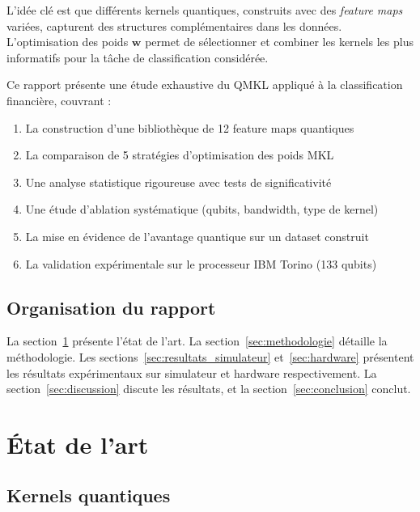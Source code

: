 \documentclass[12pt,a4paper]{article}
\newcommand{\w}{\mathbf{w}}
\begin{document}
L'idée clé est que différents kernels quantiques, construits avec des \textit{feature maps} variées, capturent des structures complémentaires dans les données. L'optimisation des poids $\w$ permet de sélectionner et combiner les kernels les plus informatifs pour la tâche de classification considérée.

Ce rapport présente une étude exhaustive du QMKL appliqué à la classification financière, couvrant :
\begin{enumerate}[noitemsep]
    \item La construction d'une bibliothèque de 12 feature maps quantiques
    \item La comparaison de 5 stratégies d'optimisation des poids MKL
    \item Une analyse statistique rigoureuse avec tests de significativité
    \item Une étude d'ablation systématique (qubits, bandwidth, type de kernel)
    \item La mise en évidence de l'avantage quantique sur un dataset construit
    \item La validation expérimentale sur le processeur IBM Torino (133 qubits)
\end{enumerate}

\subsection{Organisation du rapport}

La section~\ref{sec:etat_art} présente l'état de l'art. La section~\ref{sec:methodologie} détaille la méthodologie. Les sections~\ref{sec:resultats_simulateur} et~\ref{sec:hardware} présentent les résultats expérimentaux sur simulateur et hardware respectivement. La section~\ref{sec:discussion} discute les résultats, et la section~\ref{sec:conclusion} conclut.

\section{État de l'art}
\label{sec:etat_art}

\subsection{Kernels quantiques}
\end{document}
